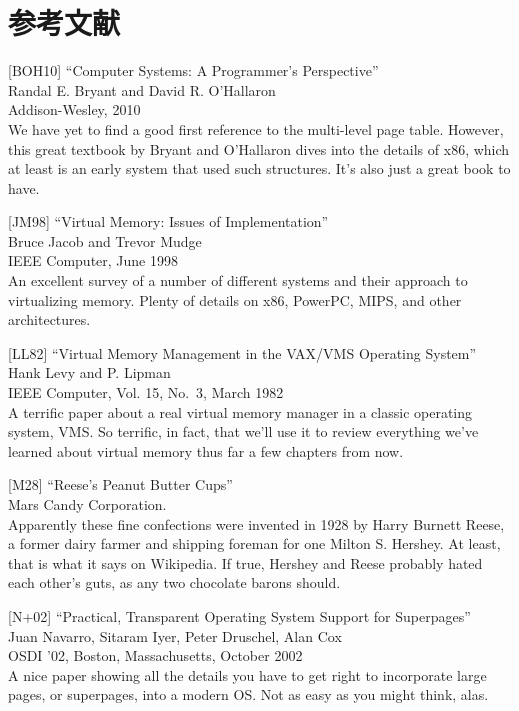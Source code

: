 \hypertarget{ux53c2ux8003ux6587ux732e-12}{%
\section*{参考文献}\label{ux53c2ux8003ux6587ux732e-12}}

{[}BOH10{]} ``Computer Systems: A Programmer's Perspective''\\
Randal E. Bryant and David R. O'Hallaron\\
Addison-Wesley, 2010\\
We have yet to find a good first reference to the multi-level page
table. However, this great textbook by Bryant and O'Hallaron dives into
the details of x86, which at least is an early system that used such
structures. It's also just a great book to have.

{[}JM98{]} ``Virtual Memory: Issues of Implementation''\\
Bruce Jacob and Trevor Mudge\\
IEEE Computer, June 1998\\
An excellent survey of a number of different systems and their approach
to virtualizing memory. Plenty of details on x86, PowerPC, MIPS, and
other architectures.

{[}LL82{]} ``Virtual Memory Management in the VAX/VMS Operating
System''\\
Hank Levy and P. Lipman\\
IEEE Computer, Vol. 15, No.~3, March 1982\\
A terrific paper about a real virtual memory manager in a classic
operating system, VMS. So terrific, in fact, that we'll use it to review
everything we've learned about virtual memory thus far a few chapters
from now.

{[}M28{]} ``Reese's Peanut Butter Cups''\\
Mars Candy Corporation.\\
Apparently these fine confections were invented in 1928 by Harry Burnett
Reese, a former dairy farmer and shipping foreman for one Milton S.
Hershey. At least, that is what it says on Wikipedia. If true, Hershey
and Reese probably hated each other's guts, as any two chocolate barons
should.

{[}N+02{]} ``Practical, Transparent Operating System Support for
Superpages''\\
Juan Navarro, Sitaram Iyer, Peter Druschel, Alan Cox\\
OSDI '02, Boston, Massachusetts, October 2002\\
A nice paper showing all the details you have to get right to
incorporate large pages, or superpages, into a modern OS. Not as easy as
you might think, alas.

